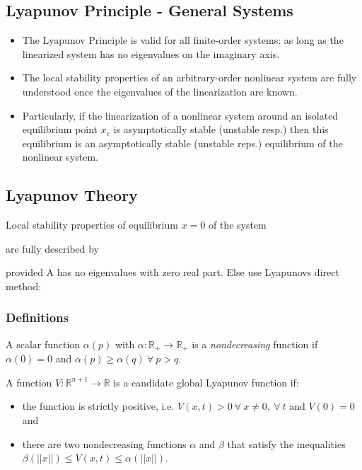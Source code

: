 \documentclass[10pt,a4paper]{scrartcl}
\begin{document}
\begin{multicols*}{3}
\subsection{Lyapunov Principle - General Systems}

\begin{itemize}
\ncompaq
\item The Lyapunov Principle is valid for all finite-order systems: as long as the linearized system has no eigenvalues on the imaginary axis.
\item The local stability properties of an arbitrary-order nonlinear system are fully understood once the eigenvalues of the linearization are known.
\item Particularly, if the linearization of a nonlinear system around an isolated equilibrium point $x_e$ is asymptotically stable (unstable resp.) then this equilibrium is an asymptotically stable (unstable reps.) equilibrium of the nonlinear system.
\end{itemize}

\subsection{Lyapunov Theory}

Local stability properties of equilibrium $x=0$ of the system


are fully described by


provided A has no eigenvalues with zero real part. Else use Lyapunovs direct method:

\subsubsection{Definitions}

A scalar function $\alpha(p)$ with $\alpha:\mathbb{R}_+\rightarrow\mathbb{R}_+$ is a \emph{nondecreasing} function if $\alpha(0)=0$ and $\alpha(p)\geq\alpha(q)\ \forall\ p>q$.

A function $V:\mathbb{R}^{n+1}\rightarrow \mathbb{R}$ is a candidate global Lyapunov function if:

\begin{itemize}
\ncompaq
\item the function is strictly positive, i.e. $V(x,t)>0\ \forall\ x\neq 0,\ \forall\ t$ and $V(0) = 0$ and
\item there are two nondecreasing functions $\alpha$ and $\beta$ that satisfy the inequalities $\beta(||x||)\leq V(x,t)\leq\alpha(||x||)$.
\end{itemize}


\end{multicols*}
\end{document}
